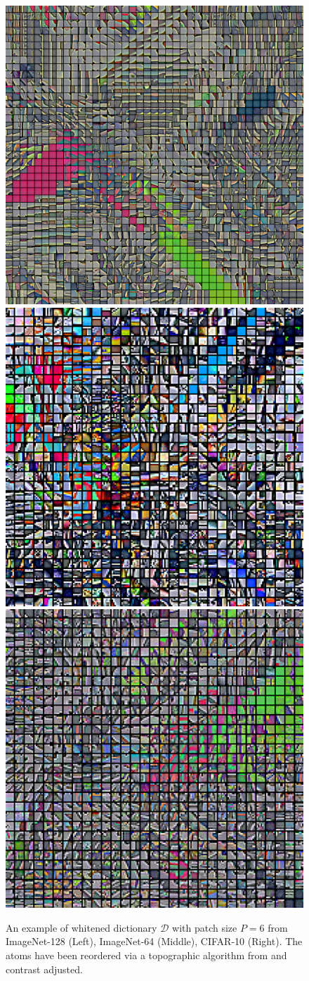 \documentclass{article} %
\begin{document}
\begin{figure}[h]
\centering
\caption{An example of whitened dictionary  $\mathcal{D}$ with patch size $P=6$ from ImageNet-128 (Left), ImageNet-64 (Middle), CIFAR-10 (Right). The atoms have been reordered via a topographic algorithm from \citet{Montobbio:2019} and contrast adjusted.}
  	\includegraphics[width=0.28\linewidth]{figures/topographical_order_more_patches_imagenet128_patches_12}
  	  	\includegraphics[width=0.28\linewidth]{figures/topographical_order_more_patches_imagnet64_patches_6_30Images}
  	  	\includegraphics[width=0.28\linewidth]{figures/topographical_order_more_patches_cifar10_patches_6_30images}
\label{dico}
\end{figure}
\end{document}
